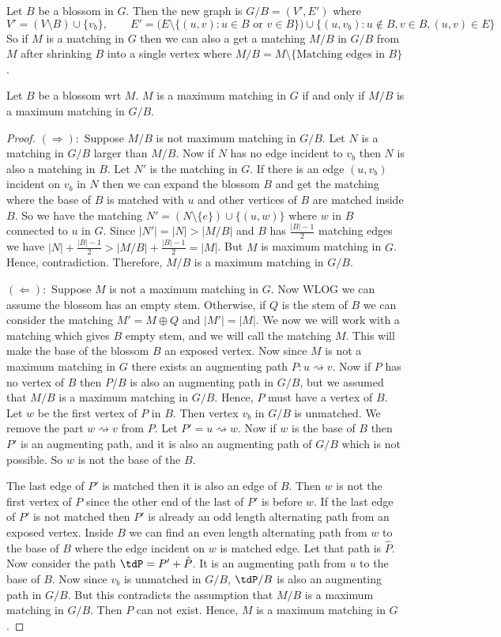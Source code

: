 Let $B$ be a blossom in $G$. Then the new graph is $G/B=(V',E')$ where $$V'=(V\setminus B)\cup \{v_b\},\qquad E'=\Big(E\setminus\{(u,v)\colon u\in B\text{ or }v\in B\}\Big)\cup \{(u,v_b)\colon u\notin B, v\in B, (u,v)\in E\}$$ So if $M$ is a matching in $G$ then we can also a get a matching $M/B$  in $G/B$ from $M$ after shrinking $B$ into  a single vertex where $M/B=M\setminus \{\text{Matching edges in $B$}\}$.
\begin{Theorem}{}{}
	Let $B$ be a blossom wrt $M$. $M$ is a maximum matching in $G$ if and only if $M/B$ is a maximum matching in $G/B$.
\end{Theorem}
\begin{proof}
	$(\Longrightarrow):$ Suppose $M/B$ is not maximum matching in $G/B$. Let $N$ is a matching in $G/B$ larger than $M/B$. Now if $N$ has no edge incident to $v_b$ then $N$ is also a matching in $B$. Let $N'$ is the matching in $G$. If there is an edge $(u,v_b)$ incident on $v_b$ in $N$ then we can expand the blossom $B$ and get the matching where the base of $B$ is matched with $u$ and other vertices of $B$ are matched inside $B$. So we have the matching $N'=(N\setminus\{e\})\cup \{(u,w)\}$ where $w$ in $B$ connected to $u$ in $G$. Since $|N'|=|N|>|M/B|$ and $B$ has $\frac{|B|-1}2$ matching edges we have $|N|+\frac{|B|-1}2>|M/B|+\frac{|B|-1}2=|M|$. But $M$ is maximum matching in $G$. Hence, contradiction. Therefore, $M/B$ is a maximum matching in $G/B$.

	$(\Longleftarrow):$ Suppose $M$ is not a maximum matching in $G$. Now WLOG we can assume the blossom has an empty stem. Otherwise, if $Q$ is the stem of $B$ we can consider the matching $M'=M\oplus Q$ and $|M'|=|M|$. We now we will work with a matching which gives $B$ empty stem, and we will call the matching $M$. This will make the base of the blossom $B$ an exposed vertex. Now since $M$ is not a maximum matching in $G$ there exists an augmenting path $P:u\rightsquigarrow v$. Now if $P$ has no vertex of $B$ then $P/B$ is also an augmenting path in $G/B$, but we assumed that $M/B$ is a maximum matching in $G/B$. Hence, $P$ must have a vertex of $B$. Let $w$ be the first vertex of $P$ in $B$. Then vertex $v_b$ in $G/B$ is unmatched. We remove the part $w\rightsquigarrow v$ from $P$. Let $P'=u\rightsquigarrow w$. Now if $w$ is the base of $B$ then $P'$ is an augmenting path, and it is also an augmenting path of $G/B$ which is not possible. So $w$ is not the base of the $B$.

	The last  edge of $P'$ is matched then it is also an edge of $B$. Then $w$ is not the first vertex of $P$ since the other end of the last of $P'$ is before $w$. If the last edge of $P'$ is not matched then $P'$ is already an odd length alternating path from an exposed vertex. Inside $B$ we can find an even length alternating path from $w$ to the base of $B$ where the edge incident on $w$ is matched edge. Let that path is $\hat{P}$. Now consider the path $\tdP=P'+\hat{P}$. It is an augmenting path from $u$ to the base of $B$. Now since $v_b$ is unmatched in $G/B$, $\tdP/B$ is also an augmenting path in $G/B$. But this contradicts the assumption that $M/B$ is a maximum matching in $G/B$. Then $P$ can not exist. Hence, $M$ is a maximum matching in $G$.
\end{proof}

